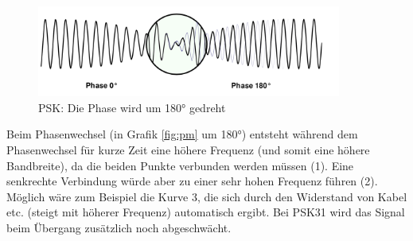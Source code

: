 \begin{figure}[h!]
 \centering
 \includegraphics[width=10cm]{./png/Amfu-PSK.png}
 \caption{PSK: Die Phase wird um 180° gedreht}
 \label{fig:psk}
\end{figure}

Beim Phasenwechsel (in Grafik \ref{fig:pm} um 180°) entsteht während dem Phasenwechsel für kurze Zeit eine höhere Frequenz (und somit eine höhere Bandbreite), da die beiden Punkte verbunden werden müssen (1). Eine senkrechte Verbindung würde aber zu einer sehr hohen Frequenz führen (2). Möglich wäre zum Beispiel die Kurve 3, die sich durch den Widerstand von Kabel etc. (steigt mit höherer Frequenz) automatisch ergibt. Bei PSK31 wird das Signal beim Übergang zusätzlich noch abgeschwächt.